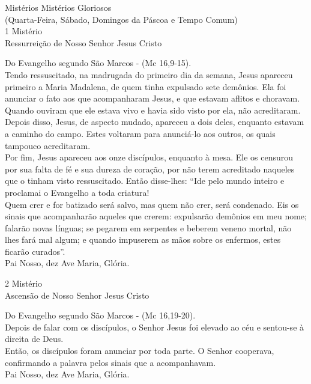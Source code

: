 \documentclass{book}
\begin{document}
\newpage
\begin{center}
    Mistérios Mistérios Gloriosos \\ \textcolor{VioletRed2}{\scriptsize{(Quarta-Feira, Sábado, Domingos da Páscoa e Tempo Comum)}} \\
    \hfill{} \break{}
    1\textordmasculine{} Mistério \\ Ressurreição de Nosso Senhor Jesus Cristo
\end{center}
\begin{flushleft}
    Do Evangelho segundo São Marcos - (\textcolor{VioletRed2}{Mc 16,9-15}). \\
    \hfill{} \break{}
    Tendo ressuscitado, na madrugada do primeiro dia da semana, Jesus apareceu primeiro a Maria Madalena, de quem tinha expulsado sete demônios. Ela foi anunciar o fato aos que acompanharam Jesus, e que estavam aflitos e choravam. Quando ouviram que ele estava vivo e havia sido visto por ela, não acreditaram. Depois disso, Jesus, de aspecto mudado, apareceu a dois deles, enquanto estavam a caminho do campo. Estes voltaram para anunciá-lo aos outros, os quais tampouco acreditaram.
    \vspace{.2cm} \\
    Por fim, Jesus apareceu aos onze discípulos, enquanto à mesa. Ele os censurou por sua falta de fé e sua dureza de coração, por não terem acreditado naqueles que o tinham visto ressuscitado. Então disse-lhes: ``Ide pelo mundo inteiro e proclamai o Evangelho a toda criatura!
    \vspace{.2cm} \\
    Quem crer e for batizado será salvo, mas quem não crer, será condenado. Eis os sinais que acompanharão aqueles que crerem: expulsarão demônios em meu nome; falarão novas línguas; se pegarem em serpentes e beberem veneno mortal, não lhes fará mal algum; e quando impuserem as mãos sobre os enfermos, estes ficarão curados''. \\
    \hfill{} \break{}
    Pai Nosso, dez Ave Maria, Glória.
\end{flushleft}
\begin{center}
    2\textordmasculine{} Mistério \\ Ascensão de Nosso Senhor Jesus Cristo
\end{center}
\begin{flushleft}
    Do Evangelho segundo São Marcos - (\textcolor{VioletRed2}{Mc 16,19-20}). \\
    \hfill{} \break{}
    Depois de falar com os discípulos, o Senhor Jesus foi elevado ao céu e sentou-se à direita de Deus.
    \vspace{.2cm} \\
    Então, os discípulos foram anunciar por toda parte. O Senhor cooperava, confirmando a palavra pelos sinais que a acompanhavam. \\
    \hfill{} \break{}
    Pai Nosso, dez Ave Maria, Glória.
\end{flushleft}
\end{document}
